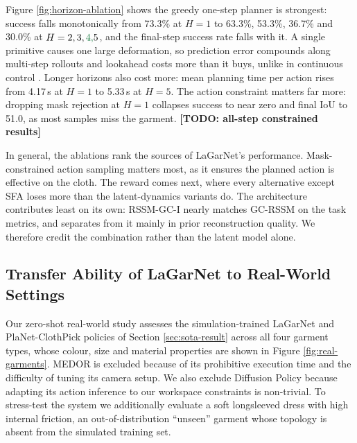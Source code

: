 \documentclass[journal]{IEEEtran}
\newif\ifshowrev\showrevtrue
\newcommand{\rev}[1]{\ifshowrev\textcolor{revblue}{#1}\else#1\fi}
\newif\ifshowirev\showirevtrue
\newcommand{\irev}[1]{\ifshowirev\textcolor{irevgreen}{#1}\else#1\fi}
\newif\ifshowrrev\showrrevtrue
\newcommand{\rrev}[1]{\ifshowrrev\textcolor{rrevred}{#1}\else#1\fi}
\begin{document}
\rev{Figure \ref{fig:horizon-ablation} shows the greedy one-step planner is strongest: success falls monotonically from 73.3\% at $H=1$ to 63.3\%, 53.3\%, \irev{36.7\%} and 30.0\% at $H=2,3,\irev{4,}5$, and the final-step success rate falls with it. A single primitive causes one large deformation, so prediction error compounds along multi-step rollouts and lookahead costs more than it buys, unlike in continuous control \cite{hafner2019learning}. \irev{Longer horizons also cost more: mean planning time per action rises from 4.17\,s at $H=1$ to 5.33\,s at $H=5$.} The action constraint matters far more: dropping mask rejection at $H=1$ collapses success to near zero and final IoU to \irev{51.0}, as most samples miss the garment. \rrev{\textbf{[TODO: all-step constrained results]}}}

\rev{In general, the ablations rank the sources of LaGarNet's performance. Mask-constrained action sampling matters most, as it ensures the planned action is effective on the cloth. The reward comes next, where every alternative except SFA loses more than the latent-dynamics variants do. The architecture contributes least on its own: RSSM-GC-I nearly matches GC-RSSM on the task metrics, and separates from it mainly in prior reconstruction quality. We therefore credit the combination rather than the latent model alone.}


\subsection{Transfer Ability of LaGarNet to Real-World Settings} \label{sec:real-exp}



\rev{Our zero-shot real-world study assesses the simulation-trained LaGarNet and PlaNet-ClothPick policies of Section \ref{sec:sota-result} across all four garment types, whose colour, size and material properties are shown in Figure \ref{fig:real-garments}. MEDOR is excluded because of its prohibitive execution time and the difficulty of tuning its camera setup. We also exclude Diffusion Policy because adapting its action inference to our workspace constraints is non-trivial. To stress-test the system we additionally evaluate a soft longsleeved dress with high internal friction, an out-of-distribution ``unseen'' garment whose topology is absent from the simulated training set.} 
\end{document}

